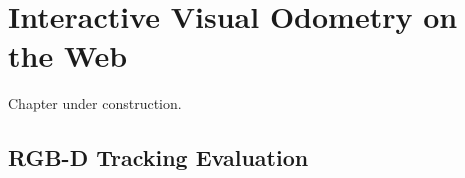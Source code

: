 \chapter{Interactive Visual Odometry on the Web}%
\label{cha:interactive_vo_on_the_web}

\minitoc%
\clearpage

Chapter under construction.

\section{RGB-D Tracking Evaluation}%
\label{sec:rgbd-tracking-evaluation}

%
%
